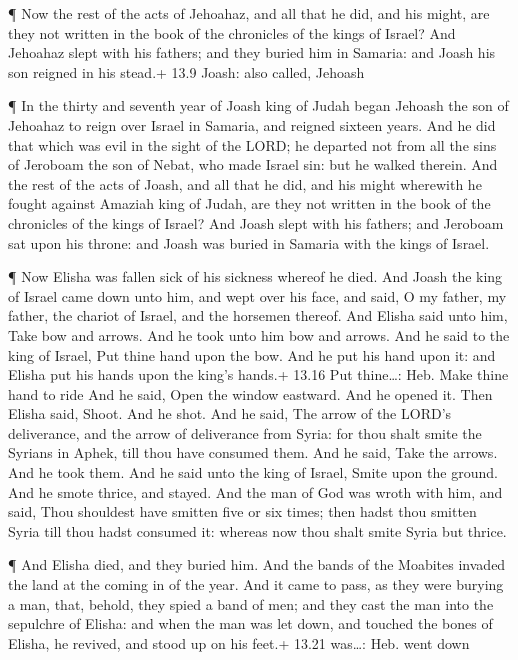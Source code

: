  ¶ Now the rest of the acts of Jehoahaz, and all that he
did, and his might, are they not written in the book of the chronicles
of the kings of Israel?  And Jehoahaz slept with his
fathers; and they buried him in Samaria: and Joash his son reigned in
his stead.+ 13.9 Joash: also called, Jehoash

 ¶ In the thirty and seventh year of Joash king of Judah
began Jehoash the son of Jehoahaz to reign over Israel in Samaria, and
reigned sixteen years.  And he did that which was evil in
the sight of the LORD; he departed not from all the sins of Jeroboam the
son of Nebat, who made Israel sin: but he walked therein. 
And the rest of the acts of Joash, and all that he did, and his might
wherewith he fought against Amaziah king of Judah, are they not written
in the book of the chronicles of the kings of Israel?  And
Joash slept with his fathers; and Jeroboam sat upon his throne: and
Joash was buried in Samaria with the kings of Israel.

 ¶ Now Elisha was fallen sick of his sickness whereof he
died. And Joash the king of Israel came down unto him, and wept over his
face, and said, O my father, my father, the chariot of Israel, and the
horsemen thereof.  And Elisha said unto him, Take bow and
arrows. And he took unto him bow and arrows.  And he said
to the king of Israel, Put thine hand upon the bow. And he put his hand
upon it: and Elisha put his hands upon the king's hands.+ 13.16 Put
thine\ldots: Heb. Make thine hand to ride  And he said,
Open the window eastward. And he opened it. Then Elisha said, Shoot. And
he shot. And he said, The arrow of the LORD's deliverance, and the arrow
of deliverance from Syria: for thou shalt smite the Syrians in Aphek,
till thou have consumed them.  And he said, Take the
arrows. And he took them. And he said unto the king of Israel, Smite
upon the ground. And he smote thrice, and stayed.  And the
man of God was wroth with him, and said, Thou shouldest have smitten
five or six times; then hadst thou smitten Syria till thou hadst
consumed it: whereas now thou shalt smite Syria but thrice.

 ¶ And Elisha died, and they buried him. And the bands of
the Moabites invaded the land at the coming in of the year.
 And it came to pass, as they were burying a man, that,
behold, they spied a band of men; and they cast the man into the
sepulchre of Elisha: and when the man was let down, and touched the
bones of Elisha, he revived, and stood up on his feet.+ 13.21 was\ldots:
Heb. went down

